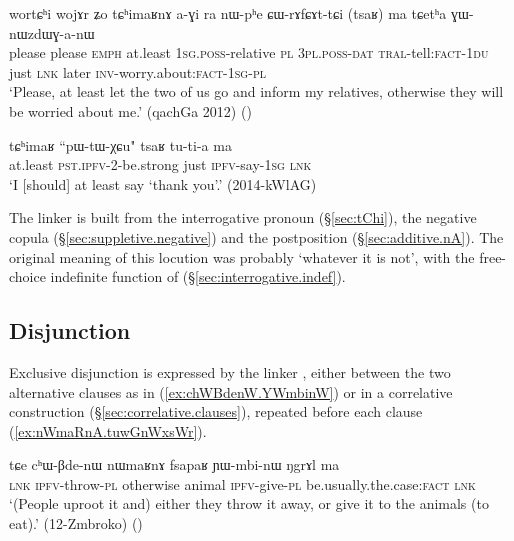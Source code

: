 \begin{exe}
\ex \label{ex:tChimaRnA.CWrAfCAttCi}
\gll wortɕʰi wojɤr ʑo tɕʰimaʁnɤ a-ɣi ra nɯ-pʰe ɕɯ-rɤfɕɤt-tɕi (tsaʁ) ma tɕetʰa ɣɯ-nɯzdɯɣ-a-nɯ \\
please please \textsc{emph} at.least \textsc{1sg}.\textsc{poss}-relative \textsc{pl} \textsc{3pl}.\textsc{poss}-\textsc{dat} \textsc{tral}-tell:\textsc{fact}-\textsc{1du} just \textsc{lnk} later \textsc{inv}-worry.about:\textsc{fact}-\textsc{1sg}-\textsc{pl} \\
\glt `Please, at least let the two of us go and inform my relatives, otherwise they will be worried about me.' (qachGa 2012)
()
\end{exe} 

\begin{exe}
\ex \label{ex:tChimaR.tsaR}
\gll  tɕʰimaʁ ``pɯ-tɯ-χɕu" tsaʁ tu-ti-a ma \\
at.least \textsc{pst}.\textsc{ipfv}-2-be.strong just \textsc{ipfv}-say-\textsc{1sg} \textsc{lnk} \\
\glt `I [should] at least say `thank you'.' (2014-kWlAG)
\end{exe} 

The linker  is built from the interrogative pronoun  (§\ref{sec:tChi}), the negative copula  (§\ref{sec:suppletive.negative}) and the postposition  (§\ref{sec:additive.nA}). The original meaning of this locution was probably `whatever it is not', with the free-choice indefinite function of  (§\ref{sec:interrogative.indef}).

\subsection{Disjunction} \label{sec:disjunction.clauses}
Exclusive disjunction is expressed by the linker , either between the two alternative clauses as in (\ref{ex:chWBdenW.YWmbinW}) or in a correlative construction (§\ref{sec:correlative.clauses}), repeated before each clause (\ref{ex:nWmaRnA.tuwGnWxsWr}).

\begin{exe}
\ex \label{ex:chWBdenW.YWmbinW}
\gll tɕe cʰɯ-βde-nɯ nɯmaʁnɤ fsapaʁ ɲɯ-mbi-nɯ ŋgrɤl ma \\
\textsc{lnk} \textsc{ipfv}-throw-\textsc{pl} otherwise animal \textsc{ipfv}-give-\textsc{pl} be.usually.the.case:\textsc{fact} \textsc{lnk} \\
\glt `(People uproot it and) either they throw it away, or give it to the animals (to eat).' (12-Zmbroko)
()
\end{exe} 

